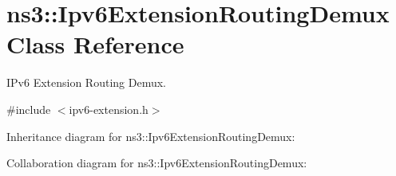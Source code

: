 \hypertarget{classns3_1_1Ipv6ExtensionRoutingDemux}{}\section{ns3\+:\+:Ipv6\+Extension\+Routing\+Demux Class Reference}
\label{classns3_1_1Ipv6ExtensionRoutingDemux}


I\+Pv6 Extension Routing Demux.  




{\ttfamily \#include $<$ipv6-\/extension.\+h$>$}



Inheritance diagram for ns3\+:\+:Ipv6\+Extension\+Routing\+Demux\+:


Collaboration diagram for ns3\+:\+:Ipv6\+Extension\+Routing\+Demux\+:
